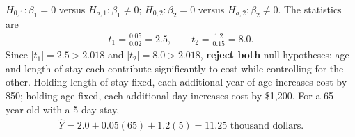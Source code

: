 \begin{solproblema}[prob:a6a21c3]
$H_{0,1}:\beta_1=0$ versus $H_{a,1}:\beta_1\ne0$; $H_{0,2}:\beta_2=0$ versus $H_{a,2}:\beta_2\ne0$. The statistics are
\begin{align}
t_1=\frac{0.05}{0.02}=2.5,\qquad t_2=\frac{1.2}{0.15}=8.0.
\end{align}
Since $|t_1|=2.5>2.018$ and $|t_2|=8.0>2.018$, \textbf{reject both} null hypotheses: age and length of stay each contribute significantly to cost while controlling for the other. Holding length of stay fixed, each additional year of age increases cost by \$50; holding age fixed, each additional day increases cost by \$1,200. For a 65-year-old with a 5-day stay,
\begin{align}
\hat Y=2.0+0.05(65)+1.2(5)=11.25\text{ thousand dollars.}
\end{align}
\end{solproblema}
